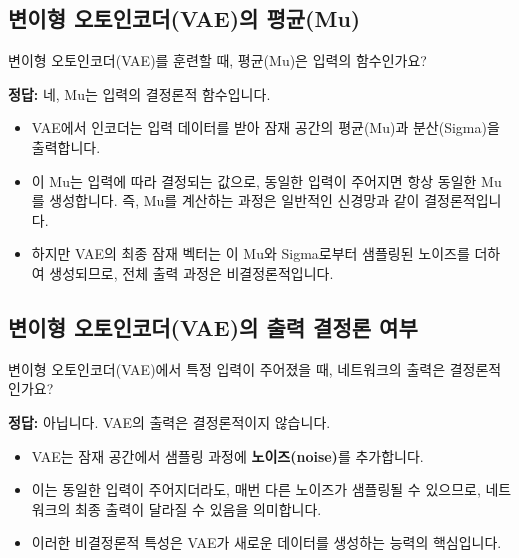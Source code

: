 \documentclass[11pt,a4paper]{article}
\theoremstyle{definition}
\begin{document}
\subsection{변이형 오토인코더(VAE)의 평균(Mu)}
\begin{tcolorbox}[mybox, title={질문 4: VAE의 평균(Mu)은 입력의 함수인가?}]
변이형 오토인코더(VAE)를 훈련할 때, 평균(Mu)은 입력의 함수인가요?
\end{tcolorbox}

\begin{tcolorbox}[summary, title={정답 및 설명}]
\textbf{정답:} 네, Mu는 입력의 결정론적 함수입니다.
\begin{itemize}
    \item VAE에서 인코더는 입력 데이터를 받아 잠재 공간의 평균(Mu)과 분산(Sigma)을 출력합니다.
    \item 이 Mu는 입력에 따라 결정되는 값으로, 동일한 입력이 주어지면 항상 동일한 Mu를 생성합니다. 즉, Mu를 계산하는 과정은 일반적인 신경망과 같이 결정론적입니다.
    \item 하지만 VAE의 최종 잠재 벡터는 이 Mu와 Sigma로부터 샘플링된 노이즈를 더하여 생성되므로, 전체 출력 과정은 비결정론적입니다.
\end{itemize}
\end{tcolorbox}

\subsection{변이형 오토인코더(VAE)의 출력 결정론 여부}
\begin{tcolorbox}[mybox, title={질문 5: VAE의 출력 결정론 여부}]
변이형 오토인코더(VAE)에서 특정 입력이 주어졌을 때, 네트워크의 출력은 결정론적인가요?
\end{tcolorbox}

\begin{tcolorbox}[summary, title={정답 및 설명}]
\textbf{정답:} 아닙니다. VAE의 출력은 결정론적이지 않습니다.
\begin{itemize}
    \item VAE는 잠재 공간에서 샘플링 과정에 \textbf{노이즈(noise)}를 추가합니다.
    \item 이는 동일한 입력이 주어지더라도, 매번 다른 노이즈가 샘플링될 수 있으므로, 네트워크의 최종 출력이 달라질 수 있음을 의미합니다.
    \item 이러한 비결정론적 특성은 VAE가 새로운 데이터를 생성하는 능력의 핵심입니다.
\end{itemize}
\end{tcolorbox}
\end{document}

